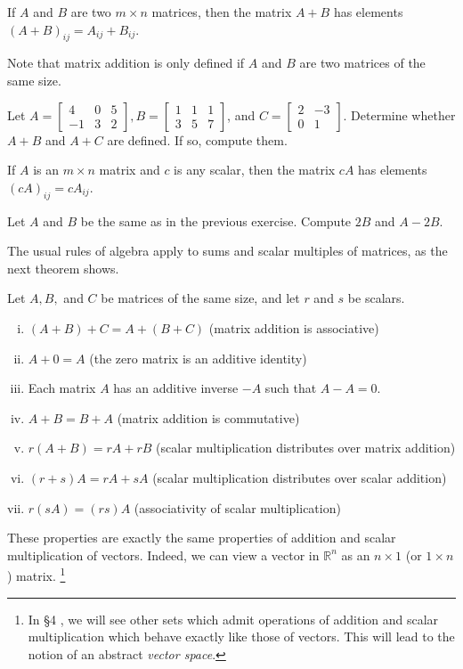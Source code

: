 \documentclass[12pt,letterpaper,reqno]{article}
\numberwithin{equation}{section}
\newcommand{\R}{\ensuremath{\mathbb R}}
\newcommand{\fixme}[1]{{\color{orange}{[#1]}}}
\begin{document}
\begin{defn}
	If $A$ and $B$ are two $m \times n$ matrices, then the matrix $A+B$ has elements $(A+B)_{ij}=A_{ij}+B_{ij}$.
\end{defn}
Note that matrix addition is only defined if $A$ and $B$ are two matrices of the same size.
\begin{exercise}
	Let $A=\begin{bmatrix}
	4&0&5 \\ -1&3&2
\end{bmatrix}, B=\begin{bmatrix}
	1&1&1\\3&5&7
\end{bmatrix}$, and $C=\begin{bmatrix}
	2&-3 \\ 0&1
\end{bmatrix}$. Determine whether $A+B$ and $A+C$ are defined. If so, compute them.
\end{exercise}


\begin{defn}
	If $A$ is an $m \times n$ matrix and $c$ is any scalar, then the matrix $cA$ has elements $(cA)_{ij}=cA_{ij}$.
\end{defn}

\begin{exercise}
Let $A$ and $B$ be the same as in the previous exercise. Compute $2B$ and $A-2B$.	
\end{exercise}

The usual rules of algebra apply to sums and scalar multiples of matrices, as the next theorem shows.

\begin{thm}\label{thm:matrix_add_scalar_multiply_properties}
Let $A,B,$ and $C$ be matrices of the same size, and let $r$ and $s$ be scalars.
	\begin{enumerate}[(i)]
		\item $(A+B)+C=A+(B+C)$ (matrix addition is associative)
		\item $A+0=A$ (the zero matrix is an additive identity)
		\item Each matrix $A$ has an additive inverse $-A$ such that $A-A=0$.
		\item $A+B=B+A$ (matrix addition is commutative) 
		\item $r(A+B)=rA+rB$ (scalar multiplication distributes over matrix addition)
		\item $(r+s)A=rA+sA$ (scalar multiplication distributes over scalar addition)
		\item $r(sA)=(rs)A$ (associativity of scalar multiplication)
	\end{enumerate}
	These properties are exactly the same properties of addition and scalar multiplication of vectors. Indeed, we can view a vector in $\R^n$ as an $n \times 1$ (or $1 \times n$) matrix. \footnote{In \S 4 \fixme{Add link.}, we will see other sets which admit operations of addition and scalar multiplication which behave exactly like those of vectors. This will lead to the notion of an abstract \emph{vector space}.}
\end{thm}
\end{document}
